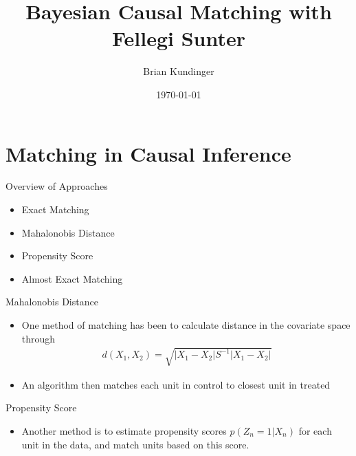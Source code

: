 \documentclass{beamer}
\begin{document}
	\title{Bayesian Causal Matching with Fellegi Sunter}
	\author{Brian Kundinger}
	\date{\today}
	

	
	\begin{frame}
		\titlepage
	\end{frame}

\section{Matching in Causal Inference}
\begin{frame}{Overview of Approaches}
	\begin{itemize}
		\item Exact Matching
		\item Mahalonobis Distance
		\item Propensity Score
		\item Almost Exact Matching
	\end{itemize}
\end{frame}

\begin{frame}{Mahalonobis Distance}
	\begin{itemize}
	\item One method of matching has been to calculate distance in the covariate space through
		\begin{align}
			d(X_1, X_2) = \sqrt{|X_1 - X_2| S^{-1} |X_1 - X_2|}
		\end{align}
	\item An algorithm then matches each unit in control to closest unit in treated
	\end{itemize}
\end{frame}

\begin{frame}{Propensity Score}
	\begin{itemize}
	\item Another method is to estimate propensity scores $p(Z_n = 1 |X_n)$ for each unit in the data, and match units based on this score.
	\end{itemize}
\end{frame}
\end{document}
